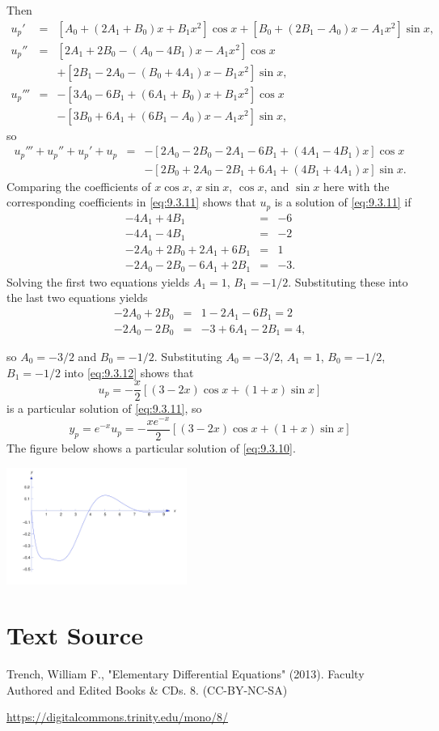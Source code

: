 \documentclass{ximera}
\begin{document}
\begin{example}
\begin{explanation}
Then
\begin{eqnarray*}
 u_p'&=&[A_0+(2A_1+B_0)x+B_1x^2]\cos
x+[B_0+(2B_1-A_0)x-A_1x^2]\sin x,\\
 u_p''&=&[2A_1+2B_0-(A_0-4B_1)x-A_1x^2]\cos x\\&&+
[2B_1-2A_0-(B_0+4A_1)x-B_1x^2]\sin x,\\
u_p'''&=&-[3A_0-6B_1+(6A_1+B_0)x+B_1x^2]\cos x
\\&&-[3B_0+6A_1+(6B_1-A_0)x-A_1x^2]\sin x,
\end{eqnarray*}
so
$$
\begin{array}{rcl}
u_p'''+u_p''+u_p'+u_p&=&
-[2A_0-2B_0-2A_1-6B_1+(4A_1-4B_1)x]\cos x\\
&&-[2B_0+2A_0-2B_1+6A_1+(4B_1+4A_1)x]\sin x.
\end{array}
$$
Comparing the coefficients of $x\cos x$, $x\sin x$, $\cos x$, and
$\sin x$ here with the corresponding coefficients in \eqref{eq:9.3.11}
shows that $u_p$ is a solution of \eqref{eq:9.3.11} if
$$
\begin{array}{rcr}
-4A_1+4B_1&=&-6\\
-4A_1-4B_1&=&-2\\
-2A_0+2B_0+2A_1+6B_1&=&1\\
-2A_0-2B_0-6A_1+2B_1&=&-3.
\end{array}
$$
Solving the first two equations yields $A_1=1$, $B_1=-1/2$.
Substituting these into the last two equations  yields
\begin{eqnarray*}
-2A_0+2B_0&=&1-2A_1-6B_1=2\\
-2A_0-2B_0&=&-3+6A_1-2B_1=4,
 \end{eqnarray*}

so $A_0=-3/2$ and $B_0=-1/2$.
Substituting $A_0=-3/2$, $A_1=1$, $B_0=-1/2$, $B_1=-1/2$ into
\eqref{eq:9.3.12} shows that
$$
u_p=-\frac{x}{2}\left[(3-2x)\cos
x+(1+x)\sin x\right]
$$
is a particular solution of  \eqref{eq:9.3.11}, so
$$
 y_p=e^{-x}u_p=-\frac{xe^{-x}}{2}\left[(3-2x)\cos
x+(1+x)\sin x\right]
$$
The figure below shows a particular  solution of \eqref{eq:9.3.10}.
\begin{image}
 \includegraphics[height=1.5in]{fig090304.jpg} 
\end{image}

\end{explanation}
\end{example}


\section*{Text Source}
Trench, William F., "Elementary Differential Equations" (2013). Faculty Authored and Edited Books \& CDs. 8. (CC-BY-NC-SA)

\href{https://digitalcommons.trinity.edu/mono/8/}{https://digitalcommons.trinity.edu/mono/8/}
\end{document}
